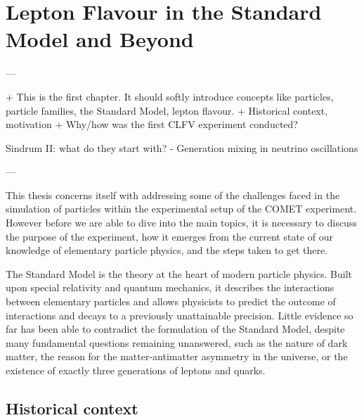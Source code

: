 \chapter{Lepton Flavour in the Standard Model and Beyond}\label{chapter1}

\begin{markdown}
---

+ This is the first chapter. It should softly introduce concepts like particles, particle families, the Standard Model, lepton flavour.
+ Historical context, motivation
 + Why/how was the first CLFV experiment conducted?

Sindrum II: what do they start with?
 - Generation mixing in neutrino oscillations


---
\end{markdown}


This thesis concerns itself with addressing some of the challenges faced in the simulation of particles within the experimental setup of the COMET experiment.  %
However before we are able to dive into the main topics, it is necessary to discuss the purpose of the experiment, how it emerges from the current state of our knowledge of elementary particle physics, and the steps taken to get there.



The Standard Model is the theory at the heart of modern particle physics. Built upon special relativity and quantum mechanics, it describes the interactions between elementary particles and allows physicists to predict the outcome of interactions and decays to a previously unattainable precision. Little evidence so far has been able to contradict the formulation of the Standard Model, despite many fundamental questions remaining unanswered, such as the nature of dark matter, the reason for the matter-antimatter asymmetry in the universe, or the existence of exactly three generations of leptons and quarks.




\section{Historical context}

